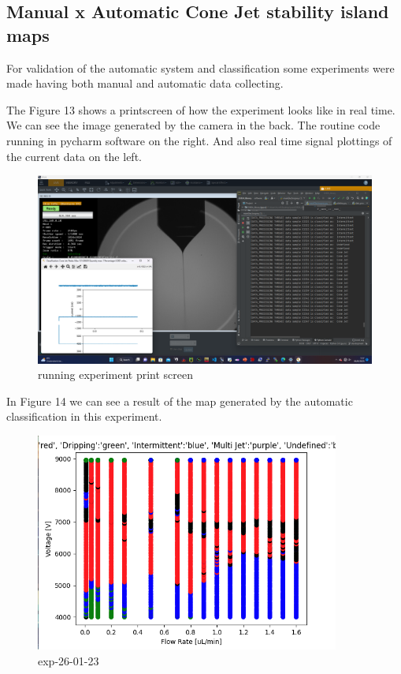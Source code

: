 \subsection{Manual x Automatic Cone Jet stability island maps}

For validation of the automatic system and classification some experiments were made having both manual and automatic data collecting.

The Figure 13 shows a printscreen of how the experiment looks like in real time.
We can see the image generated by the camera in the back.
The routine code running in pycharm software on the right.
And also real time signal plottings of the current data on the left.

\begin{figure}[H]
    \center
    \includegraphics[width=17cm]{Figuras/report3/screenshots/stableConeExp.png}
    \caption{running experiment print screen}
\end{figure}

In Figure 14 we can see a result of the map generated by the automatic classification in this experiment.

\begin{figure}[H]
    \center
    \includegraphics[width=10cm]{Figuras/report3/map-exp-26-01.png}
    \caption{ exp-26-01-23 }
\end{figure}

